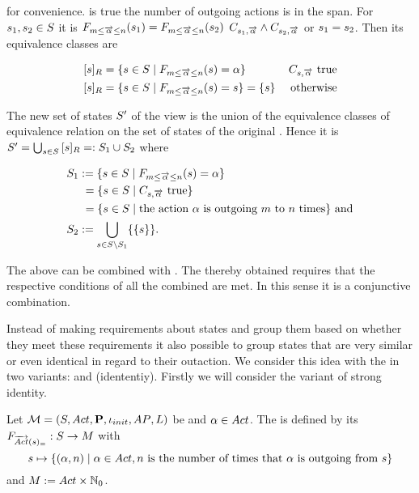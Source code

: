 \documentclass[preview]{standalone}
\begin{document}
for convenience. \formoutact is true  \iffN the number of outgoing actions is in the span. For ${s}_1, {s}_2 \in {S}$ it is ${{F_{{m}\leq{\overrightarrow{\ensuremath{{\alpha}}}}\leq{n}}}}({s}_1) = {{F_{{m}\leq{\overrightarrow{\ensuremath{{\alpha}}}}\leq{n}}}}({s}_2)$ \iffN $\formoutact[\state_1] \land \formoutact[\state_2]$ or ${s}_1 = {s}_2$. Then its equivalence classes are

\begin{align*}
	{\ensuremath{{[{s}]_{{R}}}}} &= \{{s} \in {S} \mid {\ensuremath{{F_{{m}\leq{\overrightarrow{\ensuremath{{\alpha}}}}\leq{n}}}}}({s}) = {\alpha}\} &{C_{{s},{\overrightarrow{{\alpha}}}}} \text{ true} \\
	{{[{s}]_{{R}}}} &= \{{s} \in {S} \mid {\ensuremath{{F_{{m}\leq{\overrightarrow{\ensuremath{{\alpha}}}}\leq{n}}}}}({s}) = {s}\} = \{{s}\} &\text{ otherwise}	
\end{align*}

The new set of states ${S}'$ of the view \viewspanoutaction is the union of the equivalence classes of equivalence relation \eqrelview on the set of states \states of the original \chgphN. Hence it is ${S}' = \bigcup_{{s} \in {S}} {{[{s}]_{{R}}}} =: {S}_1 \cup {S}_2$ where

\begin{align*}
	{S}_1 &:= \{{s} \in {S} \mid {\ensuremath{{F_{{m}\leq{\overrightarrow{\ensuremath{{\alpha}}}}\leq{n}}}}}({s}) = {\alpha}\} \\
	&\hspace{1.15mm}= \{{s} \in {S}  \mid {C_{\ensuremath{{s}},\ensuremath{{\overrightarrow{{\alpha}}}}}} \text{ true}\} \\
	&\hspace{1.15mm}= \{{s} \in {S} \mid \text{the action } {\alpha} \text{ is outgoing } {m} \text{ to } {n} \text{ times}\} \text{ and} \\
	{S}_2 &:= {\bigcup_{{s} \in {S} \setminus {S}_1}\{\{{s}\}\}}.
\end{align*}

The \viewsN above can be combined with \parllcompN. The thereby obtained \viewN requires that the respective conditions of all the combined \viewsN are met. In this sense it is a conjunctive combination.

Instead of making requirements about states and group them based on whether they meet these requirements it also possible to group states that are very similar or even identical in regard to their outaction. We consider this idea with the \emph{\outactident \viewNC} in two variants: \outactidentstrong and \outactidentweak (idententiy). Firstly we will consider the variant of strong identity.

\begin{definition}
	Let ${{{\mathcal{M}}}} = {{({S}, {Act}, {\textbf{P}}, {\iota_{init}}, {AP}, {L})}}$ be \achgphN and ${\alpha} \in {Act}$. The \viewN \viewstrongoutactident is defined by its \grpfctN ${{F_{{\overrightarrow{{Act}}}({s})_=}}} : {S} \to {\ensuremath{{M}}}$ with
	\[
	\state \mapsto	
	\{(\action, \numoutact) \mid \action \in \actions, \numoutact \text{ is the number of times that \action is outgoing from } \state\}
	\]
	and ${{M}} := {Act} \times {\mathbb{N}}_0$.
\end{definition}
\end{document}
